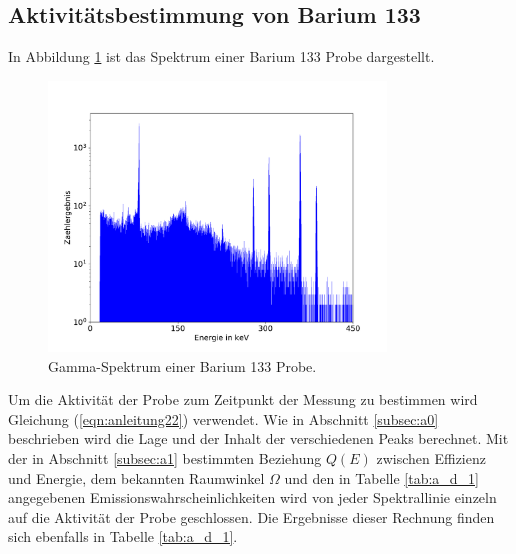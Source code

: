 \subsection{Aktivitätsbestimmung von Barium 133}
\label{subsec:a3}
In Abbildung \ref{fig:Spektrum_Barium} ist das Spektrum einer Barium 133 Probe dargestellt.
\begin{figure}
\centering
\includegraphics[width=0.8\textwidth]{python/plots/spec3.pdf}
\caption{Gamma-Spektrum einer Barium 133 Probe.}
\label{fig:Spektrum_Barium}
\end{figure}
Um die Aktivität der Probe zum Zeitpunkt der Messung zu bestimmen wird Gleichung (\ref{eqn:anleitung22}) verwendet.
Wie in Abschnitt \ref{subsec:a0} beschrieben wird die Lage und der Inhalt der verschiedenen Peaks berechnet.
Mit der in Abschnitt \ref{subsec:a1} bestimmten Beziehung $Q(E)$ zwischen Effizienz und Energie, dem bekannten Raumwinkel $\Omega$ und den in Tabelle \ref{tab:a_d_1} angegebenen Emissionswahrscheinlichkeiten wird von jeder Spektrallinie einzeln auf die Aktivität der Probe geschlossen.
Die Ergebnisse dieser Rechnung finden sich ebenfalls in Tabelle \ref{tab:a_d_1}.
